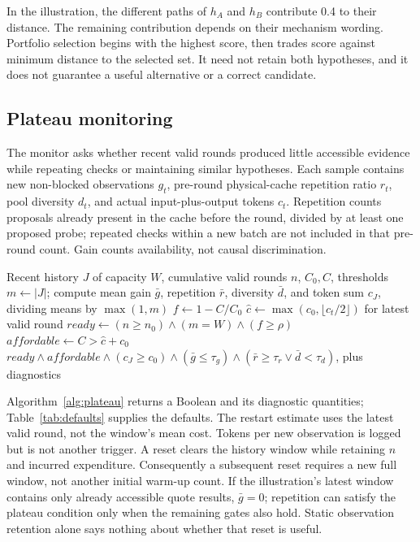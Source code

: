 \documentclass[letterpaper,journal]{IEEEtran}
\begin{document}
In the illustration, the different paths of $h_A$ and $h_B$ contribute 0.4 to their distance. The remaining contribution depends on their mechanism wording. Portfolio selection begins with the highest score, then trades score against minimum distance to the selected set. It need not retain both hypotheses, and it does not guarantee a useful alternative or a correct candidate.

\subsection{Plateau monitoring}\label{sec:plateau}
The monitor asks whether recent valid rounds produced little accessible evidence while repeating checks or maintaining similar hypotheses. Each sample contains new non-blocked observations $g_t$, pre-round physical-cache repetition ratio $r_t$, pool diversity $d_t$, and actual input-plus-output tokens $c_t$. Repetition counts proposals already present in the cache before the round, divided by at least one proposed probe; repeated checks within a new batch are not included in that pre-round count. Gain counts availability, not causal discrimination.

\begin{algorithm}[t]
\caption{Plateau decision (canonical Algorithm 2)}\label{alg:plateau}
\begin{algorithmic}[1]\small
\Require Recent history $J$ of capacity $W$, cumulative valid rounds $n$, $C_0,C$, thresholds
\State $m\gets |J|$; compute mean gain $\bar g$, repetition $\bar r$, diversity $\bar d$, and token sum $c_J$, dividing means by $\max(1,m)$
\State $f\gets1-C/C_0$
\State $\widehat c\gets\max(c_0,\lfloor c_t/2\rfloor)$ for latest valid round
\State $ready\gets(n\ge n_0)\land(m=W)\land(f\ge\rho)$
\State $affordable\gets C>\widehat c+c_0$
\State \Return $ready\land affordable\land(c_J\ge c_0)\land(\bar g\le\tau_g)\land(\bar r\ge\tau_r\lor\bar d<\tau_d)$, plus diagnostics
\end{algorithmic}
\end{algorithm}

Algorithm~\ref{alg:plateau} returns a Boolean and its diagnostic quantities; Table~\ref{tab:defaults} supplies the defaults. The restart estimate uses the latest valid round, not the window's mean cost. Tokens per new observation is logged but is not another trigger. A reset clears the history window while retaining $n$ and incurred expenditure. Consequently a subsequent reset requires a new full window, not another initial warm-up count. If the illustration's latest window contains only already accessible quote results, $\bar g=0$; repetition can satisfy the plateau condition only when the remaining gates also hold. Static observation retention alone says nothing about whether that reset is useful.
\end{document}
